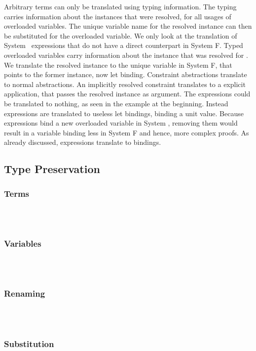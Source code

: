 \noindent Arbitrary terms can only be translated using typing information. The typing carries information about the instances that were resolved, for all usages of overloaded variables. The unique variable name for the resolved instance can then be substituted for the overloaded variable. We only look at the translation of System \Fo\ expressions that do not have a direct counterpart in System F.
\DPTTerms
Typed overloaded variables  carry information about the instance that was resolved for .
We translate the resolved instance to the unique variable in System F, that points to the former instance, now let binding. 
Constraint abstractions translate to normal abstractions. 
An implicitly resolved constraint translates to a explicit application, that passes the resolved instance as argument. The  expressions could be translated to nothing, as seen in the example at the beginning. Instead  expressions are translated to useless let bindings, binding a unit value.
Because  expressions bind a new overloaded variable in System \Fo, removing them would result in a variable binding less in System F and hence, more complex proofs.
As already discussed,  expressions translate to  bindings.

\subsection{Type Preservation}
\subsubsection{Terms}\hfill\\\\
\DPTTermPres
\subsubsection{Variables}\hfill\\\\
\DPTVarPresLookup
\DPTOVarPresLookup
\subsubsection{Renaming}\hfill\\\\
\DPTVarPresRen
\DPTTypePresRen
\DPTTypePresWk
\DPTTypePresWkInst
\subsubsection{Substitution}\hfill\\\\
\DPTVarPresSub
\DPTTypePresSub
\DPTTypePresSingleSub